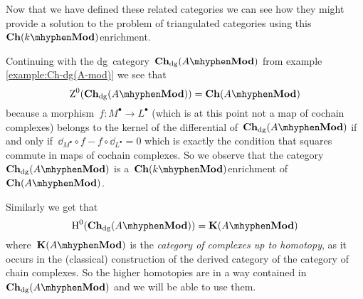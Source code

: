 \begin{refsection}
Now that we have defined these related categories we can see how they might provide a solution to the problem of triangulated categories using this~$\Ch(k\mhyphen\Mod)$\dash enrichment.
\begin{example}
  \label{example:Z0(Ch-dg(A-mod))}
  Continuing with the dg~category~$\Ch_\dg(A\mhyphen\Mod)$ from example \ref{example:Ch-dg(A-mod)} we see that
  \begin{equation}
    \ZZ^0(\Ch_\dg(A\mhyphen\Mod))=\Ch(A\mhyphen\Mod)
  \end{equation}
  because a morphism~$f\colon M^\bullet\to L^\bullet$ (which is at this point not a map of cochain complexes) belongs to the kernel of the differential of~$\Ch_\dg(A\mhyphen\Mod)$ if and only if~$\dd_{M^\bullet}\circ f-f\circ\dd_{L^\bullet}=0$ which is exactly the condition that squares commute in maps of cochain complexes. So we observe that the category~$\Ch_\dg(A\mhyphen\Mod)$ is a~$\Ch(k\mhyphen\Mod)$\dash enrichment of~$\Ch(A\mhyphen\Mod)$.
  
  Similarly we get that
  \begin{equation}
    \HH^0(\Ch_\dg(A\mhyphen\Mod))=\KKK(A\mhyphen\Mod) 
  \end{equation}
  where~$\KKK(A\mhyphen\Mod)$ is the \emph{category of complexes up to homotopy}, as it occurs in the (classical) construction of the derived category of the category of chain complexes. So the higher homotopies are in a way contained in~$\Ch_\dg(A\mhyphen\Mod)$ and we will be able to use them.
\end{example}


\end{refsection}
